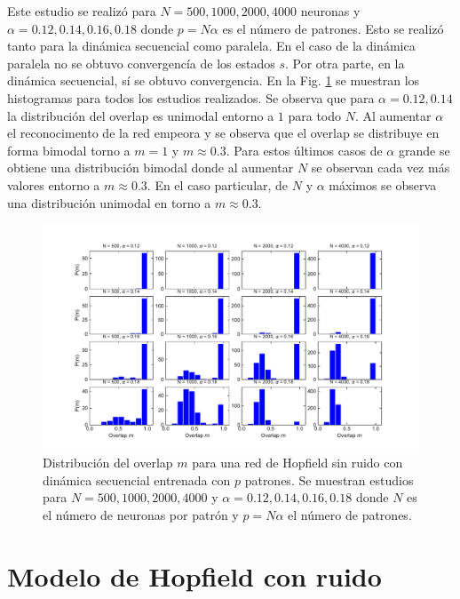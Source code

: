 \documentclass[11pt,twocolumn,twoside]{opticajnl}
\begin{document}
Este estudio se realizó para $N=500,1000,2000,4000$ neuronas y $\alpha = 0.12,0.14,0.16,0.18$ donde $p = N\alpha$ es el número de patrones. Esto se realizó tanto para la dinámica secuencial como paralela. En el caso de la dinámica paralela no se obtuvo convergencía de los estados $s$. Por otra parte, en la dinámica secuencial, sí se obtuvo convergencia. En la Fig. \ref{fig:hist_sec}  se muestran los histogramas para todos los estudios realizados. Se observa que para $\alpha = 0.12, 0.14$ la distribución del overlap es unimodal entorno a $1$ para todo $N$. Al aumentar $\alpha$ el reconocimento de la red empeora y se observa que el overlap se distribuye en forma bimodal torno a $m = 1$ y $m \approx 0.3$. Para estos últimos casos de $\alpha$ grande se obtiene una distribución bimodal donde al aumentar $N$ se observan cada vez más valores entorno a $m \approx 0.3$. En el caso particular, de $N$ y $\alpha$ máximos se observa una distribución unimodal en torno a $m \approx 0.3$.


\begin{figure}[t]
    \centering
        \includegraphics[width=\textwidth]{Figuras/hist_sec.pdf}
    \caption{Distribución del overlap $m$ para una red de Hopfield sin ruido con dinámica secuencial entrenada con $p$ patrones. Se muestran estudios para $N=500,1000,2000,4000$ y $\alpha = 0.12,0.14,0.16,0.18$ donde $N$ es el número de neuronas por patrón y $p = N\alpha$ el número de patrones.} 
    \label{fig:hist_sec}
\end{figure}


\section{Modelo de Hopfield con ruido\label{sec:ej2}}
\end{document}

